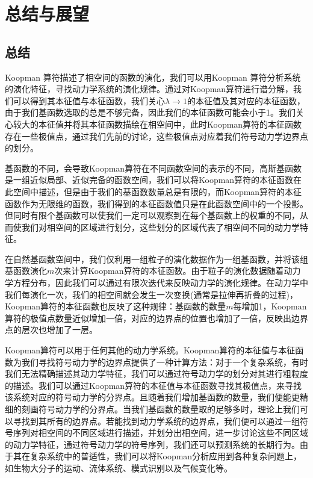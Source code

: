 \chapter{总结与展望}
\section{总结}
Koopman 算符描述了相空间的函数的演化，我们可以用Koopman 算符分析系统的演化特征，寻找动力学系统的演化规律。通过对Koopman算符进行谱分解，我们可以得到其本征值与本征函数，我们关心$\lambda\rightarrow 1$的本征值及其对应的本征函数，由于我们基函数选取的总是不够完备，因此我们的本征函数可能会小于1。我们关心较大的本征值并将其本征函数描绘在相空间中，此时Koopman算符的本征函数存在一些极值点，通过我们先前的讨论，这些极值点对应着我们符号动力学边界点的划分。

基函数的不同，会导致Koopman算符在不同函数空间的表示的不同，高斯基函数是一组近似局部、近似完备的函数空间，我们可以将Koopman算符的本征函数在此空间中描述，但是由于我们的基函数数量总是有限的，而Koopman算符的本征函数作为无限维的函数，我们得到的本征函数值只是在此函数空间中的一个投影。但同时有限个基函数可以使我们一定可以观察到在每个基函数上的权重的不同，从而使我们对相空间的区域进行划分，这些划分的区域代表了相空间不同的动力学特征。

在自然基函数空间中，我们仅利用一组粒子的演化数据作为一组基函数，并将该组基函数演化$m$次来计算Koopman算符的本征函数。由于粒子的演化数据随着动力学方程分布，因此我们可以通过有限次迭代来反映动力学的演化规律。在动力学中我们每演化一次，我们的相空间就会发生一次变换(通常是拉伸再折叠的过程)，Koopman算符的本征函数也反映了这种规律：基函数的数量$m$每增加1，Koopman算符的极值点数量近似增加一倍，对应的边界点的位置也增加了一倍，反映出边界点的层次也增加了一层。

Koopman算符可以用于任何其他的动力学系统。Koopman算符的本征值与本征函数为我们寻找符号动力学的边界点提供了一种计算方法：对于一个复杂系统，有时我们无法精确描述其动力学特征，我们可以通过符号动力学的划分对其进行粗粒度的描述。我们可以通过Koopman算符的本征值与本征函数寻找其极值点，来寻找该系统对应的符号动力学的分界点。且随着我们增加基函数的数量，我们便能更精细的刻画符号动力学的分界点。当我们基函数的数量取的足够多时，理论上我们可以寻找到其所有的边界点。若能找到动力学系统的边界点，我们便可以通过一组符号序列对相空间的不同区域进行描述，并划分出相空间，进一步讨论这些不同区域的动力学特征，通过符号动力学的符号序列，我们还可以预测系统的长期行为。由于其在复杂系统中的普适性，我们可以将Koopman分析应用到各种复杂问题上，如生物大分子的运动、流体系统、模式识别以及气候变化等。

